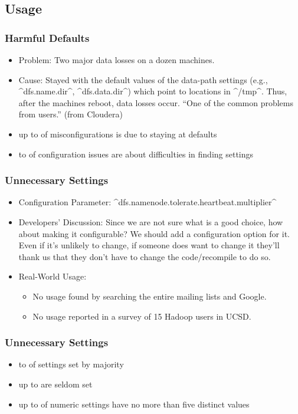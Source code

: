 \subsection{Usage}

\begin{frame}[fragile]
	\frametitle{Harmful Defaults~\cite{xu2015hey}}
	\begin{itemize}
	\item Problem: Two major data losses on a dozen machines.
	\item Cause:
	Stayed with the default values of the data-path settings
	(e.g., ^dfs.name.dir^, ^dfs.data.dir^) which point to locations in ^/tmp^.
	Thus, after the machines reboot, data losses occur.
	``One of the common problems from users.'' (from Cloudera)
	\item up to  of misconfigurations is due to staying at defaults
	\item {} to  of configuration issues are about difficulties in finding settings
	\end{itemize}
\end{frame}

\begin{frame}[fragile]
	\frametitle{Unnecessary Settings~\cite{xu2015hey}}
	\begin{itemize}
	\item Configuration Parameter: ^dfs.namenode.tolerate.heartbeat.multiplier^
	\item Developers' Discussion:
	Since we are not sure what is a good choice, how about making it
	configurable?
	We should add a configuration option for it. Even if it's unlikely to
	change, if someone does want to change it they'll thank us that they
	don't have to change the code/recompile to do so.
	\item Real-World Usage:
	\begin{itemize}
	\item No usage found by searching the entire mailing lists and Google.
	\item No usage reported in a survey of 15 Hadoop users in UCSD.
	\end{itemize}
	\end{itemize}
\end{frame}

\begin{frame}
	\frametitle{Unnecessary Settings~\cite{xu2015hey}}
	\begin{itemize}
	\item {} to  of settings set by majority
	\item up to  are seldom set
	\item up to  of numeric settings have no more than five distinct values
	\end{itemize}
\end{frame}

